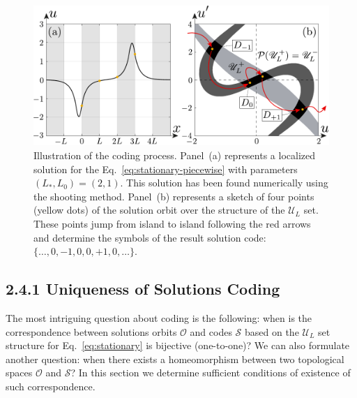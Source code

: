\begin{figure}[h]
\centering
	\includegraphics[scale = 1]{pic/solution and orbit on the phase plane}
	\caption{
		Illustration of the coding process.
		Panel~(a) represents a localized solution for the Eq.~\eqref{eq:stationary-piecewise} with parameters $(L_*, L_0) = (2, 1)$.
		This solution has been found numerically using the shooting method.
		Panel~(b) represents a sketch of four points (yellow dots) of the solution orbit over the structure of the $\mathscr{U}_L$ set.
		These points jump from island to island following the red arrows and determine the symbols of the result solution code: $\{ \dots, 0, -1, 0, 0, +1, 0, \dots \}$.
	}
\label{fig:solution-and-orbit}
\end{figure}

\subsection*{2.4.1 Uniqueness of Solutions Coding}

The most intriguing question about coding is the following: when is the correspondence between solutions orbits $\mathcal{O}$ and codes $\mathcal{S}$ based on the $\mathscr{U}_L$ set structure for Eq.~\eqref{eq:stationary} is bijective (one-to-one)?
We can also formulate another question: when there exists a homeomorphism between two topological spaces $\mathcal{O}$ and $\mathcal{S}$?
In this section we determine sufficient conditions of existence of such correspondence.

